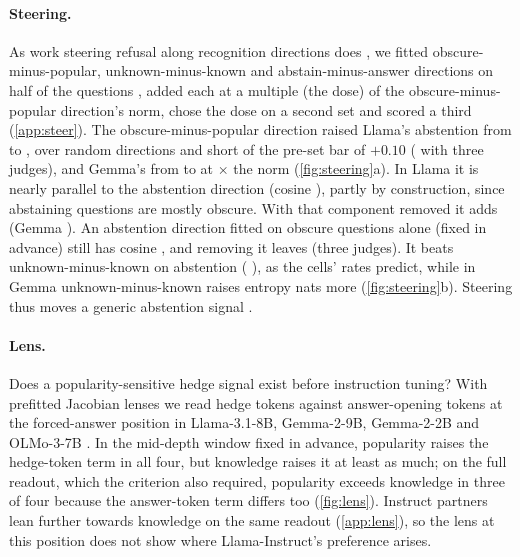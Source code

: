 \documentclass{article}
\begin{document}
\paragraph{Steering.} As work steering refusal along recognition directions does \citep{ferrando2025iknow,brzezinka2026familiarity}, we fitted obscure-minus-popular, unknown-minus-known and abstain-minus-answer directions on half of the questions \citep{arditi2024refusal,rimsky2024caa}, added each at a multiple (the dose) of the obscure-minus-popular direction's norm, chose the dose on a second set and scored a third (\cref{app:steer}). The obscure-minus-popular direction raised Llama's abstention from \svLlamaNone{} to \svLlamaFam, \svLlamaDOne{} \svLlamaDOneCI{} over random directions and short of the pre-set bar of $+0.10$ (\svLlamaMajDOne{} with three judges), and Gemma's from \svGemmaNone{} to \svGemmaFam{} at \svGemmaDose$\times$ the norm (\cref{fig:steering}a). In Llama it is nearly parallel to the abstention direction (cosine \svLlamaCos), partly by construction, since abstaining questions are mostly obscure. With that component removed it adds \svLlamaDTwo{} \svLlamaDTwoCI{} (Gemma \svGemmaDTwo{} \svGemmaDTwoCI). An abstention direction fitted on obscure questions alone (fixed in advance) still has cosine \wlLlamaCos, and removing it leaves \wlLlamaDTwo{} \wlLlamaDTwoCI{} (three judges). It beats unknown-minus-known on abstention (\svLlamaDThree{} \svLlamaDThreeCI), as the cells' rates predict, while in Gemma unknown-minus-known raises entropy \svGemmaDFour{} \svGemmaDFourCI{} nats more (\cref{fig:steering}b). Steering thus moves a generic abstention signal \citep[cf.][]{che2026steering}.

\paragraph{Lens.} Does a popularity-sensitive hedge signal exist before instruction tuning? With prefitted Jacobian lenses \citep{gurnee2026workspace} we read hedge tokens against answer-opening tokens at the forced-answer position in Llama-3.1-8B, Gemma-2-9B, Gemma-2-2B and OLMo-3-7B \citep{olmo3}. In the mid-depth window fixed in advance, popularity raises the hedge-token term in all four, but knowledge raises it at least as much; on the full readout, which the criterion also required, popularity exceeds knowledge in three of four because the answer-token term differs too (\cref{fig:lens}). Instruct partners lean further towards knowledge on the same readout (\cref{app:lens}), so the lens at this position does not show where Llama-Instruct's preference arises.
\end{document}
